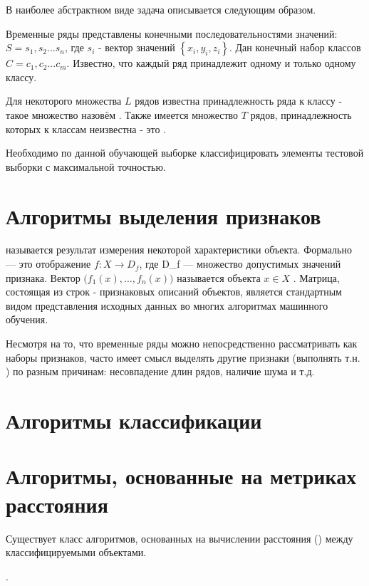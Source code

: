 В наиболее абстрактном виде задача описывается следующим образом. 

Временные ряды представлены конечными последовательностями значений: $S=s_1,s_2...s_n$, где $s_i$ - вектор значений $\left\{x_i,y_i,z_i\right\}$. Дан конечный набор классов $C=c_1,c_2...c_m$. Известно, что каждый ряд принадлежит одному и только одному классу. 

Для некоторого множества $L$ рядов известна принадлежность ряда к классу - такое множество назовём . Также имеется множество $T$ рядов, принадлежность которых к классам неизвестна - это .

Необходимо по данной обучающей выборке классифицировать элементы тестовой выборки с максимальной точностью.


\section{Алгоритмы выделения признаков}

 называется результат измерения некоторой характеристики объекта. Формально  — это отображение $f: X\to D_f $, где D\_f — множество допустимых значений признака. Вектор $\bigl( f_1(x),\ldots,f_n(x) \bigr)$ называется  объекта $x \in X$ \cite{features_def}. Матрица, состоящая из строк - признаковых описаний объектов, является стандартным видом представления исходных данных во многих алгоритмах машинного обучения. 

Несмотря на то, что временные ряды можно непосредственно рассматривать как наборы признаков, часто имеет смысл выделять другие признаки (выполнять т.н. ) по разным причинам: несовпадение длин рядов, наличие шума и т.д.







\section{Алгоритмы классификации}








\section{Алгоритмы, основанные на метриках расстояния}

Существует класс алгоритмов, основанных на вычислении расстояния () между классифицируемыми объектами. 







. 


